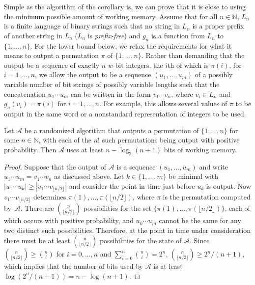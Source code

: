 \documentclass[envcountsame,envcountsect,undated,nolinenumbers]{lnthi}
\def\Tfloor#1{\lfloor #1\rfloor}
\def\TbbbN{\mathbb{N}}
\begin{document}
Simple as the algorithm of the corollary is,
we can prove that it is close to using
the minimum possible amount of working memory.
Assume that for all $n\in\TbbbN$, $L_n$ is
a finite language of binary strings such that
no string in $L_n$ is a proper prefix of
another string in $L_n$ ($L_n$ is \emph{prefix-free})
and $g_n$ is a function from $L_n$ to
$\{1,\ldots,n\}$.
For the lower bound below, we relax the requirements
for what it means to output a permutation
$\pi$ of $\{1,\ldots,n\}$.
Rather than demanding that the output be
a sequence of exactly $n$ $w$-bit integers,
the $i$th of which is $\pi(i)$, for $i=1,\ldots,n$,
we allow the output to be a sequence
$(u_1,\ldots,u_m)$ of a possibly variable
number of bit strings of possibly variable lengths
such that
the concatenation $u_1\cdots u_m$ can be written
in the form $v_1\cdots v_n$, where $v_i\in L_n$
and $g_n(v_i)=\pi(i)$ for $i=1,\ldots,n$.
For example, this allows several values of $\pi$
to be output in the same word or a nonstandard
representation of integers to be used.

\begin{theorem}
Let $\mathcal{A}$ be a randomized algorithm that
outputs a permutation
of $\{1,\ldots,n\}$ for some $n\in\TbbbN$,
with each of the $n!$ such
permutations being output with positive
probability.
Then $\mathcal{A}$ uses at least $n-\log_2(n+1)$ bits
of working memory.
\end{theorem}

\begin{proof}
Suppose that the output of $\mathcal{A}$ is a
sequence $(u_1,\ldots,u_m)$ and
write $u_1\cdots u_m=v_1\cdots v_n$
as discussed above.
Let $k\in\{1,\ldots,m\}$ be minimal
with $|u_1\cdots u_k|\ge|v_1\cdots v_{\lfloor{n/2}\rfloor}|$
and consider the point in time just
before $u_k$ is output.
Now $v_1\cdots v_{\lfloor{n/2}\rfloor}$
determines $\pi(1),\ldots,\pi(\Tfloor{{n/2}})$,
where $\pi$ is the permutation computed
by~$\mathcal{A}$.
There are
${n\choose{\Tfloor{{n/2}}}}$ possibilities
for the set $\{\pi(1),\ldots,\pi(\Tfloor{{n/2}})\}$,
each of which occurs with positive probability,
and $u_k\cdots u_m$ cannot be the same for
any two distinct such possibilities.
Therefore, at the point
in time under consideration there must be
at least ${n\choose{\Tfloor{{n/2}}}}$ possibilities
for the state of $\mathcal{A}$.
Since ${n\choose{\Tfloor{{n/2}}}}\ge{n\choose i}$
for $i=0,\ldots,n$
and $\sum_{i=0}^n{n\choose i}=2^n$,
${n\choose{\Tfloor{{n/2}}}}\ge{{2^n}/{(n+1)}}$,
which implies that
the number of bits used by $\mathcal{A}$
is at least
$\log({{2^n}/{(n+1)}})=n-\log(n+1)$.
\end{proof}
\end{document}
